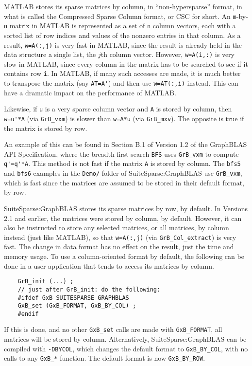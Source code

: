 \documentclass[12pt]{article}
\begin{document}
MATLAB stores its sparse matrices by column, in ``non-hypersparse'' format, in
what is called the Compressed Sparse Column format, or CSC for short.  An
\verb'm'-by-\verb'n' matrix in MATLAB is represented as a set of \verb'n'
column vectors, each with a sorted list of row indices and values of the
nonzero entries in that column.  As a result, \verb'w=A(:,j)' is very fast in
MATLAB, since the result is already held in the data structure a single list,
the $j$th column vector.  However, \verb'w=A(i,:)' is very slow in MATLAB,
since every column in the matrix has to be searched to see if it contains row
\verb'i'.  In MATLAB, if many such accesses are made, it is much better to
transpose the matrix (say \verb"AT=A'") and then use \verb"w=AT(:,i)" instead.
This can have a dramatic impact on the performance of MATLAB.

Likewise, if \verb'u' is a very sparse column vector and \verb'A' is stored by
column, then \verb"w=u'*A" (via \verb'GrB_vxm') is slower than \verb'w=A*u'
(via \verb'GrB_mxv').  The opposite is true if the matrix is stored by row.

An example of this can be found in Section B.1 of Version 1.2 of the GraphBLAS
API Specification, where the breadth-first search \verb'BFS' uses
\verb'GrB_vxm' to compute \verb"q'=q'*A".  This method is not fast if the
matrix \verb'A' is stored by column.  The \verb'bfs5' and \verb'bfs6' examples
in the \verb'Demo/' folder of SuiteSparse:GraphBLAS use \verb'GrB_vxm',
which is fast since the matrices are assumed to be stored in their
default format, by row.

SuiteSparse:GraphBLAS stores its sparse matrices by row, by default.  In
Versions 2.1 and earlier, the matrices were stored by column, by default.
However, it can also be instructed to store any selected matrices, or all
matrices, by column instead (just like MATLAB), so that \verb'w=A(:,j)' (via
\verb'GrB_Col_extract') is very fast.  The change in data format has no effect
on the result, just the time and memory usage.  To use a column-oriented format
by default, the following can be done in a user application that tends to
access its matrices by column.

    {\footnotesize
    \begin{verbatim}
    GrB_init (...) ;
    // just after GrB_init: do the following:
    #ifdef GxB_SUITESPARSE_GRAPHBLAS
    GxB_set (GxB_FORMAT, GxB_BY_COL) ;
    #endif \end{verbatim} }

If this is done, and no other \verb'GxB_set' calls are made with
\verb'GxB_FORMAT', all matrices will be stored by column.  Alternatively,
SuiteSparse:GraphBLAS can be compiled with \verb'-DBYCOL', which changes the
default format to \verb'GxB_BY_COL', with no calls to any \verb'GxB_*'
function.  The default format is now \verb'GxB_BY_ROW'.
\end{document}
